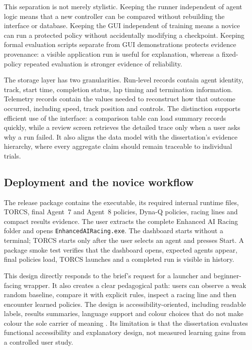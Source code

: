 This separation is not merely stylistic. Keeping the runner independent of agent logic means that a new controller can be compared without rebuilding the interface or database. Keeping the GUI independent of training means a novice can run a protected policy without accidentally modifying a checkpoint. Keeping formal evaluation scripts separate from GUI demonstrations protects evidence provenance: a visible application run is useful for explanation, whereas a fixed-policy repeated evaluation is stronger evidence of reliability.

The storage layer has two granularities. Run-level records contain agent identity, track, start time, completion status, lap timing and termination information. Telemetry records contain the values needed to reconstruct how that outcome occurred, including speed, track position and controls. The distinction supports efficient use of the interface: a comparison table can load summary records quickly, while a review screen retrieves the detailed trace only when a user asks why a run failed. It also aligns the data model with the dissertation's evidence hierarchy, where every aggregate claim should remain traceable to individual trials.

\subsection{Deployment and the novice workflow}

The release package contains the executable, its required internal runtime files, TORCS, final Agent~7 and Agent~8 policies, Dyna-Q policies, racing lines and compact results evidence. The user extracts the complete Enhanced AI Racing folder and opens \texttt{EnhancedAIRacing.exe}. The dashboard starts without a terminal; TORCS starts only after the user selects an agent and presses Start. A package smoke test verifies that the dashboard opens, expected agents appear, final policies load, TORCS launches and a completed run is visible in history.

This design directly responds to the brief's request for a launcher and beginner-facing wrapper. It also creates a clear pedagogical path: users can observe a weak random baseline, compare it with explicit rules, inspect a racing line and then encounter learned policies. The design is accessibility-oriented, including readable labels, results summaries, language support and colour choices that do not make colour the sole carrier of meaning \parencite{wcag22}. Its limitation is that the dissertation evaluates functional accessibility and explanatory design, not measured learning gains from a controlled user study.

